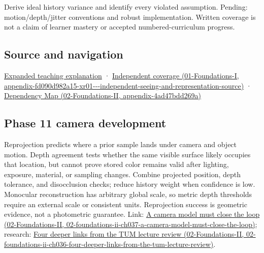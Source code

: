 Derive ideal history variance and identify every violated assumption. Pending: motion/depth/jitter conventions and robust implementation. Written coverage is not a claim of learner mastery or accepted numbered-curriculum progress.

\subsection{Source and navigation}\label{appendix-0727340a4428-source-and-navigation}

\href{Continuous\%20Notes/University\%20-\%20Worlds,\%20Images\%20and\%20Inference\%20-\%20Graphics,\%20Vision\%20and\%20Photography\#Temporal\%20reconstruction\%20is\%20an\%20inference\%20about\%20correspondence}{Expanded teaching explanation} · \href{../01-Foundations-I/main.pdf\#nameddest=appendix-fd090d982a15-xr01---independent-seeing-and-representation-source}{Independent coverage (01-Foundations-I, appendix-fd090d982a15-xr01-\/-\/-independent-seeing-and-representation-source)} · \href{../02-Foundations-II/main.pdf\#nameddest=appendix-4ad47bdd269a}{Dependency Map (02-Foundations-II, appendix-4ad47bdd269a)}

\subsection{Phase 11 camera development}\label{appendix-0727340a4428-phase-11-camera-development}

Reprojection predicts where a prior sample lands under camera and object motion. Depth agreement tests whether the same visible surface likely occupies that location, but cannot prove stored color remains valid after lighting, exposure, material, or sampling changes. Combine projected position, depth tolerance, and disocclusion checks; reduce history weight when confidence is low. Monocular reconstruction has arbitrary global scale, so metric depth thresholds require an external scale or consistent units. Reprojection success is geometric evidence, not a photometric guarantee. Link: \href{../02-Foundations-II/main.pdf\#nameddest=02-foundations-ii-ch037-a-camera-model-must-close-the-loop}{A camera model must close the loop (02-Foundations-II, 02-foundations-ii-ch037-a-camera-model-must-close-the-loop)}; research: \href{../02-Foundations-II/main.pdf\#nameddest=02-foundations-ii-ch036-four-deeper-links-from-the-tum-lecture-review}{Four deeper links from the TUM lecture review (02-Foundations-II, 02-foundations-ii-ch036-four-deeper-links-from-the-tum-lecture-review)}.

